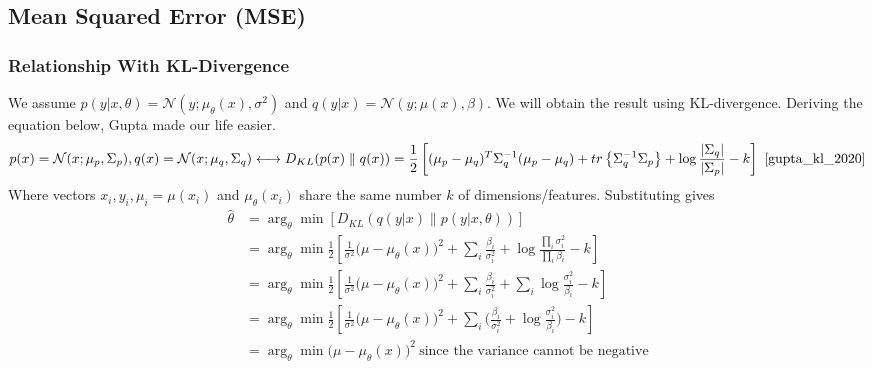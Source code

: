 \documentclass{book}
\numberwithin{equation}{subsection}
\begin{document}
\subsection{Mean Squared Error (MSE)}
\subsubsection{Relationship With KL-Divergence}
\label{mse_derivation}
We assume $p(y|x,\theta) = \mathcal{N}(y; \mu_\theta(x),\sigma^2)$ and $q(y|x) = \mathcal{N}(y; \mu(x),\beta)$. We will obtain the result using KL-divergence. Deriving the equation below, Gupta made our life easier.
\begin{equation}
    p(x) = \mathcal{N}(x;\mu_p,\Sigma_p), q(x) = \mathcal{N}(x;\mu_q,\Sigma_q) \longleftrightarrow D_{KL}(p(x) \parallel q(x)) = \frac{1}{2}\left[(\mu_p-\mu_q)^T\Sigma_q^{-1}(\mu_p-\mu_q) + tr\left\{\Sigma_q^{-1}\Sigma_p\right\}+\log\frac{|\Sigma_q|}{|\Sigma_p|} - k\right]~\cite{gupta_kl_2020}\label{gupta_kl}
\end{equation}
Where vectors $x_i, y_i, \mu_i=\mu(x_i)$ and $\mu_\theta(x_i)$ share the same number $k$ of dimensions/features. Substituting gives
\begin{align}
    \hat{\theta}
    &= \arg_\theta \min[D_{KL}(q(y|x) \parallel p(y|x,\theta))]\\
    &= \arg_\theta \min\frac{1}{2}\left[\frac{1}{\sigma^2}\big(\mu-\mu_\theta(x)\big)^2 + \sum_i\frac{\beta_i}{\sigma_i^2}+\log\frac{\prod_i\sigma_i^2}{\prod_i \beta_i} - k\right]\\
    &= \arg_\theta \min\frac{1}{2}\left[\frac{1}{\sigma^2}\big(\mu-\mu_\theta(x)\big)^2 + \sum_i\frac{\beta_i}{\sigma_i^2}+\sum_i\log\frac{\sigma_i^2}{\beta_i} - k\right]\\
    &= \arg_\theta \min\frac{1}{2}\left[\frac{1}{\sigma^2}\big(\mu-\mu_\theta(x)\big)^2 + \sum_i\Big(\frac{\beta_i}{\sigma_i^2}+\log\frac{\sigma_i^2}{\beta_i}\Big) - k\right] \label{gupta_kl_diag}\\
    &= \arg_\theta \min\big(\mu-\mu_\theta(x)\big)^2\ \text{since the variance cannot be negative}\label{mse_derivation_res2}
\end{align}
\end{document}
